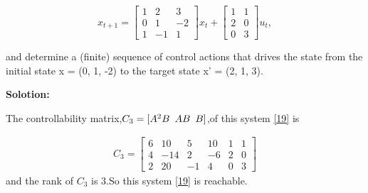\documentclass[a4paper,11pt,reqno]{amsart}
\begin{document}
\begin{equation}
    x_{t+1}=\begin{bmatrix} 1 & 2 & 3 \\ 0 & 1 & -2 \\ 1 & -1 & 1 \end{bmatrix}x_t+\begin{bmatrix} 1 & 1 \\ 2 & 0 \\ 0 & 3 \end{bmatrix}u_t,
    \label{19}
\end{equation}

and determine a (finite) sequence of control actions that drives the state from the initial state x =
(0, 1, -2) to the target state x' = (2, 1, 3).

\textbf{Solotion:}

The controllability matrix,$C_3=[A^2B \hspace{0.5em} AB \hspace{0.5em} B]$,of this system \ref{19} is

$$
\begin{aligned}
    C_3=\begin{bmatrix} 6 & 10 & 5 & 10 & 1 & 1 \\ 4 & -14 & 2 & -6 & 2 & 0 \\ 2 & 20 & -1 & 4 & 0 & 3 \end{bmatrix}
\end{aligned}
$$
and the rank of $C_3$ is 3.So this system \ref{19} is reachable.
\vspace{1em}
\end{document}
